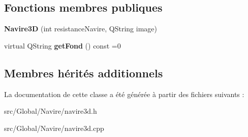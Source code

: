 \subsection*{Fonctions membres publiques}
\begin{DoxyCompactItemize}
\item 
{\bfseries Navire3D} (int resistance\+Navire, Q\+String image)\hypertarget{class_navire3_d_aecdf5b49b8220b5d4b91a836b384ed78}{}\label{class_navire3_d_aecdf5b49b8220b5d4b91a836b384ed78}

\item 
virtual Q\+String {\bfseries get\+Fond} () const  =0\hypertarget{class_navire3_d_ae4e5e4d87eebd78b3e08617d45016033}{}\label{class_navire3_d_ae4e5e4d87eebd78b3e08617d45016033}

\end{DoxyCompactItemize}
\subsection*{Membres hérités additionnels}


La documentation de cette classe a été générée à partir des fichiers suivants \+:\begin{DoxyCompactItemize}
\item 
src/\+Global/\+Navire/navire3d.\+h\item 
src/\+Global/\+Navire/navire3d.\+cpp\end{DoxyCompactItemize}
